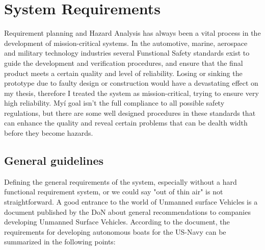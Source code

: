 \section{System Requirements}

Requirement planning and Hazard Analysis has always been a vital process in the development of mission-critical systems. In the automotive, marine, aerospace and military technology industries several Funstional Safety standards exist to guide the development and verification procedures, and ensure that the final product meets a certain quality and level of reliability. Losing or sinking the prototype due to faulty design or construction would have a devastating effect on my thesis, therefore I treated the system as mission-critical, trying to ensure very high reliability. Myí goal isn't the full compliance to all possible safety regulations, but there are some well designed procedures in these standards that can enhance the quality and reveal certain problems that can be dealth width before they become hazards.

\subsection{General guidelines}

Defining the general requirements of the system, especially without a hard functional requirement system, or we could say "out of thin air" is not straightforward. A good entrance to the world of Unmanned surface Vehicles is a document\cite{usvmasterplan} published by the DoN about general recommendations to companies developing Unmanned Surface Vehicles. According to the document, the requirements for developing autonomous boats for the US-Navy can be summarized in the following points:

